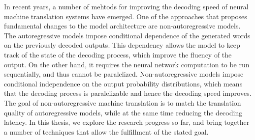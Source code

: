 In recent years, a number of mehtods for improving the decoding speed of neural
machine translation systems have emerged.
%
One of the approaches that proposes fundamental changes to the model
architecture are non-autoregressive models.
%
The autoregressive models impose conditional dependence of the generated words
on the previously decoded outputs.
%
This dependency allows the model to keep track of the state of the decoding
process, which improve the fluency of the output.
%
On the other hand, it requires the neural network computation to be run
sequentially, and thus cannot be paralelized.
%
Non-autoregressive models impose conditional independence on the output
probability distributions, which means that the decoding process is
paralelizable and hence the decoding speed improves.
%
The goal of non-autoregressive machine translation is to match the translation
quality of autoregressive models, while at the same time reducing the decoding
latency.
%
In this thesis, we explore the research progress so far, and bring together
a number of techniques that allow the fulfillment of the stated goal.


